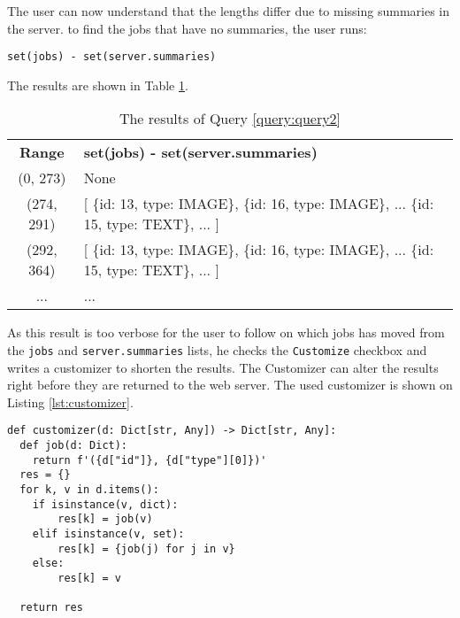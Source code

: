 \documentclass[sigconf,review]{acmart}
\begin{document}
    The user can now understand that the lengths differ due to missing summaries in the server.
    to find the jobs that have no summaries, the user runs:
    \begin{lstlisting}[style={query},label={query:query2}]
    set(jobs) - set(server.summaries)
    \end{lstlisting}

    The results are shown in Table \ref{tab:q2res}.

    \begin{table}[h]
        \centering
        \begin{tabular}{|c|p{5cm}|}
            \hline
            \textbf{Range} & \textbf{set(jobs) - set(server.summaries)} \\
            (0, 273)       & None                                                                                  \\ \hline
            (274, 291)     & [ \{id: 13, type: IMAGE\}, \{id: 16, type: IMAGE\}, ... \{id: 15, type: TEXT\}, ... ] \\ \hline
            (292, 364)     & [ \{id: 13, type: IMAGE\}, \{id: 16, type: IMAGE\}, ... \{id: 15, type: TEXT\}, ... ] \\ \hline
            ...            & ...                                                                                   \\ \hline
        \end{tabular}
        \caption{The results of Query \protect\ref{query:query2}}
        \label{tab:q2res}
    \end{table}

    As this result is too verbose for the user to follow on which jobs has moved from the \texttt{jobs} and \texttt{server.summaries} lists, he checks the \texttt{Customize} checkbox and writes a customizer to shorten the results. The Customizer can alter the results right before they are returned to the web server.
    The used customizer is shown on Listing \ref{lst:customizer}.

    \begin{lstlisting}[style=python_code_short, label={lst:customizer}]
def customizer(d: Dict[str, Any]) -> Dict[str, Any]:
  def job(d: Dict):
    return f'({d["id"]}, {d["type"][0]})'
  res = {}
  for k, v in d.items():
    if isinstance(v, dict):
        res[k] = job(v)
    elif isinstance(v, set):
        res[k] = {job(j) for j in v}
    else:
        res[k] = v

  return res
    \end{lstlisting}
\end{document}

